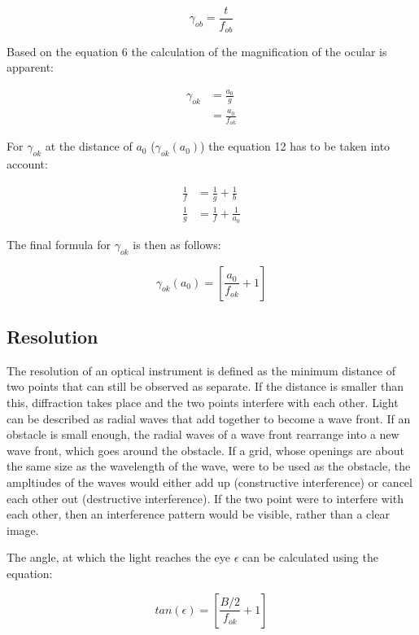\begin{equation}
  \gamma_{ob} = \frac{t}{f_{ob}} \tag{8}
  \end{equation}

Based on the equation 6 the calculation of the magnification of the ocular is apparent:

\begin{align*}
  \gamma_{ok} &= \frac{a_{0}}{g} \tag{9}\\
  &= \frac{a_0}{f_{ok}} \tag{10}
\end{align*}

For $\gamma_{ok}$ at the distance of $a_{0}$ ($\gamma_{ok}(a_{0})$) the equation 12 has to be taken into account:

\begin{align*}
  \frac{1}{f} &= \frac{1}{g} + \frac{1}{b} \tag{11} \\
  \frac{1}{g} &= \frac{1}{f} + \frac{1}{a_{0}} \tag{12}
\end{align*}

The final formula for $\gamma_{ok}$ is then as follows:

\begin{equation}
  \gamma_{ok}(a_{0}) = [\frac{a_0}{f_{ok}} + 1]\tag{13}
  \end{equation}

\subsection{Resolution}

The resolution of an optical instrument is defined as the minimum distance of two points that can still be observed as separate.
If the distance is smaller than this, diffraction takes place and the two points interfere with each other. Light can be 
described as radial waves that add together to become a wave front. If an obstacle is small enough, the radial waves of 
a wave front rearrange into a new wave front, which goes around the obstacle. If a grid, whose openings are about the same
size as the wavelength of the wave, were to be used as the obstacle, the ampltiudes of the waves would either add up 
(constructive interference) or cancel each other out (destructive interference). If the two point were to interfere with each 
other, then an interference pattern would be visible, rather than a clear image.

The angle, at which the light reaches the eye $\epsilon$ can be calculated using the equation:

\begin{equation}
  tan(\epsilon) = [\frac{B/2}{f_{ok}} + 1]\tag{14}
  \end{equation}


